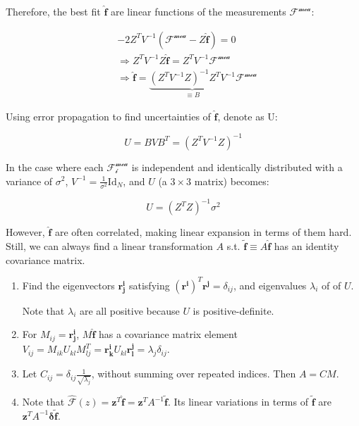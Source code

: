 Therefore, the best fit ${\bm{\hat{f}}}$ are linear functions of the
measurements $\bm{\mathcal{F^\text{mea}}}$:

\begin{align}
    & -2 Z^T V^{-1} (\bm{\mathcal{F^\text{mea}}} - Z \bm{\hat{f}}) = 0 \\
    &\Longrightarrow Z^T V^{-1} Z \bm{\hat{f}}
        = Z^T V^{-1} \bm{\mathcal{F^\text{mea}}} \\
    &\Longrightarrow \bm{\hat{f}}
        = \underbrace{
            (Z^T V^{-1} Z)^{-1} Z^T V^{-1}
        }_{\equiv B} \bm{\mathcal{F^\text{mea}}}
\end{align}

Using error propagation to find uncertainties of $\bm{\hat{f}}$, denote as U:

\begin{equation}
    U = B V B^T = (Z^T V^{-1} Z)^{-1}
\end{equation}

In the case where each $\mathcal{F^\text{mea}_\text{$i$}}$ is independent and
identically distributed with a variance of $\sigma^2$,
$V^{-1} = \frac{1}{\sigma^2} \text{Id}_N$,
and $U$ (a $3 \times 3$ matrix) becomes:

\begin{equation}
    U = (Z^T Z)^{-1} \sigma^2
\end{equation}

However, $\bm{\hat{f}}$ are often correlated, making linear expansion in terms
of them hard.
Still, we can always find a linear transformation $A$ s.t.
$\bm{\tilde{f}} \equiv A \bm{\hat{f}}$ has an identity covariance matrix.

\begin{enumerate}
    \item Find the eigenvectors $\bm{r^i_j}$ satisfying
        $(\bm{r^i})^T \bm{r^j} = \delta_{ij}$,
        and eigenvalues $\lambda_i$ of of $U$.

        Note that $\lambda_i$ are all positive because $U$ is positive-definite.

    \item For $M_{ij} = \bm{r^i_j}$, $M \bm{\hat{f}}$ has a covariance
        matrix element
        $V_{ij} = M_{ik} U_{kl} M^T_{lj} = \bm{r^i_k} U_{kl} \bm{r^j_l}
            = \lambda_j \delta_{ij}$.

    \item Let $C_{ij} = \delta_{ij} \frac{1}{\sqrt{\lambda_j}}$, without summing
        over repeated indices.
        Then $A = C M$.

    \item Note that
        $\mathcal{\hat{F}}(z) = \bm{z}^T \bm{\hat{f}} = \bm{z}^T A^{-1} \bm{\tilde{f}}$.
        Its linear variations in terms of $\bm{\tilde{f}}$ are
        $\bm{z}^T A^{-1} \bm{\delta \tilde{f}}$.
\end{enumerate}

